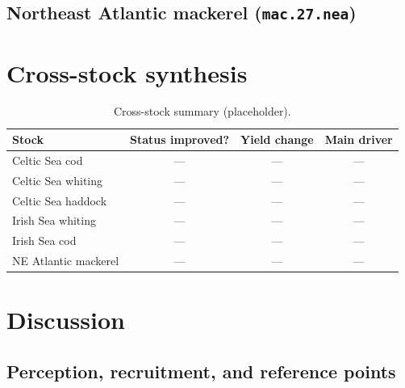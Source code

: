 \documentclass[11pt,a4paper]{extarticle}
\begin{document}
\subsection{Northeast Atlantic mackerel (\texttt{mac.27.nea})}
\label{sec:mac.27.nea}

\FloatBarrier

\section{Cross-stock synthesis}
\label{sec:synthesis}



\begin{table}[H]
\centering
\caption{Cross-stock summary (placeholder).}
\label{tab:synthesis}
\begin{tabular}{@{}lccc@{}}
\toprule
Stock & Status improved? & Yield change & Main driver \\
\midrule
Celtic Sea cod & --- & --- & --- \\
Celtic Sea whiting & --- & --- & --- \\
Celtic Sea haddock & --- & --- & --- \\
Irish Sea whiting & --- & --- & --- \\
Irish Sea cod & --- & --- & --- \\
NE Atlantic mackerel & --- & --- & --- \\
\bottomrule
\end{tabular}
\end{table}

\section{Discussion}
\label{sec:discussion}

\subsection{Perception, recruitment, and reference points}
\end{document}
